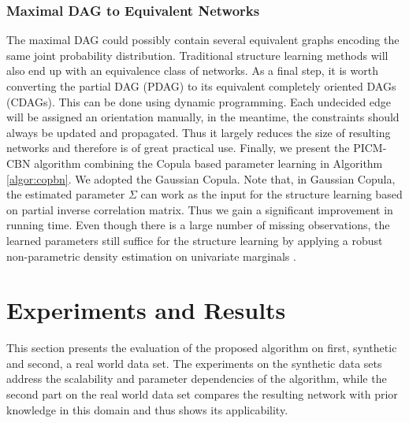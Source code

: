 \documentclass{article}
\begin{document}
\subsubsection{Maximal DAG to Equivalent Networks}
The maximal DAG could possibly contain several equivalent graphs encoding the same joint probability distribution. Traditional structure learning methods will also end up with an equivalence class of networks. As a final step, it is worth converting the partial DAG (PDAG) to its equivalent completely oriented DAGs (CDAGs). This can be done using dynamic programming. Each undecided edge will be assigned an orientation manually, in the meantime, the constraints should always be updated and propagated. Thus it largely reduces the size of resulting networks and therefore is of great practical use. 
Finally, we present the PICM-CBN algorithm combining the Copula based parameter learning in Algorithm \ref{algor:copbn}. We adopted the Gaussian Copula. Note that, in Gaussian Copula, the estimated parameter $\Sigma$ can work as the input for the structure learning based on partial inverse correlation matrix. Thus we gain a significant improvement in running time. Even though there is a large number of missing observations, the learned parameters still suffice for the structure learning by applying a robust non-parametric density estimation on univariate marginals \cite{ElidanInferenceLess}.

\section{Experiments and Results}
\label{sec:expr}
This section presents the evaluation of the proposed algorithm on first, synthetic and
second, a real world data set.
The experiments on the synthetic data sets address the scalability and
parameter dependencies of the algorithm, while the second part on the real world data set compares the resulting network 
with prior knowledge in this domain and thus shows its applicability.

% 
\end{document}
